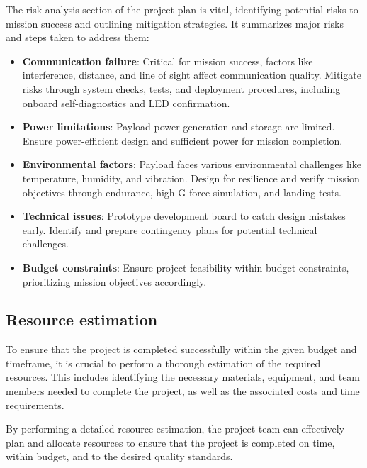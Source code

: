 
The risk analysis section of the project plan is vital, identifying potential risks to mission success and outlining mitigation strategies. It summarizes major risks and steps taken to address them:

\begin{itemize}[leftmargin=1cm, itemindent=0.25cm, noitemsep, topsep=0pt, label=$\bullet$]
\item \textbf{Communication failure}: Critical for mission success, factors like interference, distance, and line of sight affect communication quality. Mitigate risks through system checks, tests, and deployment procedures, including onboard self-diagnostics and LED confirmation.
\item \textbf{Power limitations}: Payload power generation and storage are limited. Ensure power-efficient design and sufficient power for mission completion.
\item \textbf{Environmental factors}: Payload faces various environmental challenges like temperature, humidity, and vibration. Design for resilience and verify mission objectives through endurance, high G-force simulation, and landing tests.
\item \textbf{Technical issues}: Prototype development board to catch design mistakes early. Identify and prepare contingency plans for potential technical challenges.
\item \textbf{Budget constraints}: Ensure project feasibility within budget constraints, prioritizing mission objectives accordingly.
\end{itemize}

\subsection{Resource estimation}
To ensure that the project is completed successfully within the given budget and timeframe, it is crucial to perform a thorough estimation of the required resources. This includes identifying the necessary materials, equipment, and team members needed to complete the project, as well as the associated costs and time requirements. 

By performing a detailed resource estimation, the project team can effectively plan and allocate resources to ensure that the project is completed on time, within budget, and to the desired quality standards. 

